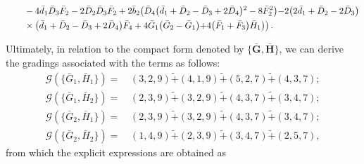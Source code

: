 \documentclass[10pt]{amsart}
\theoremstyle{definition}
\theoremstyle{corollary}
\theoremstyle{remark}
\theoremstyle{conclusion}
\begin{document}
\begin{align}
& \hskip 0.7cm-4 \bar{d}_1 \bar{D}_3 \bar{F}_2-2 \bar{D}_2 \bar{D}_3 \bar{F}_2+2 \bar{b}_2 \bigl(\bar{D}_4 \bigl(\bar{d}_1+\bar{D}_2-\bar{D}_3+2 \bar{D}_4\bigl){}^2-8 \bar{F}_2^2\bigl)-2 \bigl(2 \bar{d}_1+\bar{D}_2-2 \bar{D}_3\bigl) \nonumber \\
& \hskip 0.7cm \times \bigl(\bar{d}_1+\bar{D}_2-\bar{D}_3+2 \bar{D}_4\bigl) \bar{F}_4+4 \bar{G}_1 \bigl(\bar{G}_2-\bar{G}_1\bigl)+4 \bigl(\bar{F}_1+\bar{F}_3\bigl) \bar{H}_1\bigl)\bigl) \, .%
\end{align}

Ultimately, in relation to the compact form denoted by $\{\bar{\textbf{G}},\bar{\textbf{H}}\}$, we can derive the gradings associated with the terms as follows:
 \begin{align}
    \mathcal{G} \left(\{\bar{G}_1,\bar{H}_1\}\right) =& \, (3,2,9) \tilde{+} (4,1,9) \tilde{+}(5,2,7) \tilde{+} (4,3,7)  ; \nonumber \\
    \mathcal{G} \left(\{\bar{G}_1,\bar{H}_2\}\right) =& \, (2,3,9) \tilde{+} (3,2,9) \tilde{+}(4,3,7) \tilde{+} (3,4,7)  ; \nonumber \\
    \mathcal{G} \left(\{\bar{G}_2,\bar{H}_1\}\right) =& \,  (2,3,9) \tilde{+} (3,2,9) \tilde{+}(4,3,7) \tilde{+} (3,4,7)   ; \nonumber \\
      \mathcal{G} \left(\{\bar{G}_2,\bar{H}_2\}\right) =& \, (1,4,9) \tilde{+} (2,3,9) \tilde{+}(3,4,7) \tilde{+} (2,5,7),
\end{align} 
  from which the explicit expressions are obtained as 
\end{document}
